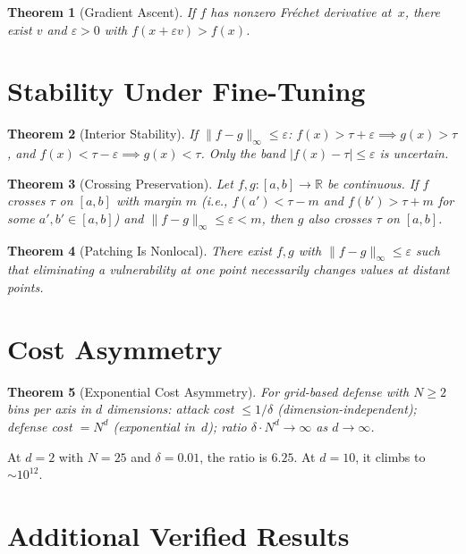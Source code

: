 \documentclass[11pt]{article}
\newtheorem{theorem}{Theorem}[section]
\newcommand{\R}{\mathbb{R}}
\begin{document}
\begin{theorem}[Gradient Ascent]
\label{thm:gradient}
If $f$ has nonzero Fr\'{e}chet derivative at~$x$, there exist $v$ and
$\varepsilon > 0$ with $f(x + \varepsilon v) > f(x)$.
\end{theorem}


\section{Stability Under Fine-Tuning}
\label{app:stability}

\begin{theorem}[Interior Stability]
\label{thm:interior-stable}
If $\|f - g\|_\infty \leq \varepsilon$:
$f(x) > \tau + \varepsilon \implies g(x) > \tau$, and
$f(x) < \tau - \varepsilon \implies g(x) < \tau$.
Only the band $|f(x) - \tau| \leq \varepsilon$ is uncertain.
\end{theorem}

\begin{theorem}[Crossing Preservation]
\label{thm:crossing}
Let $f, g\colon [a,b] \to \R$ be continuous. If $f$ crosses $\tau$
on $[a,b]$ with margin $m$ (i.e., $f(a') < \tau - m$ and
$f(b') > \tau + m$ for some $a', b' \in [a,b]$) and
$\|f - g\|_\infty \leq \varepsilon < m$, then $g$ also crosses
$\tau$ on $[a,b]$.
\end{theorem}

\begin{theorem}[Patching Is Nonlocal]
\label{thm:nonlocal}
There exist $f, g$ with $\|f-g\|_\infty \leq \varepsilon$ such that
eliminating a vulnerability at one point necessarily changes values at
distant points.
\end{theorem}


\section{Cost Asymmetry}
\label{app:cost}

\begin{theorem}[Exponential Cost Asymmetry]
\label{thm:cost}
For grid-based defense with $N \geq 2$ bins per axis in $d$ dimensions:
attack cost $\leq 1/\delta$ (dimension-independent); defense cost
$= N^d$ (exponential in~$d$); ratio
$\delta \cdot N^d \to \infty$ as $d\to\infty$.
\end{theorem}

At $d=2$ with $N=25$ and $\delta=0.01$, the ratio is $6.25$.
At $d=10$, it climbs to $\sim 10^{12}$.


\section{Additional Verified Results}
\label{app:additional}
\end{document}
